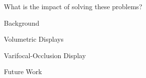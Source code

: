 \begin{compact_todolist}
\begin{compact_todolist}
    \item What is the impact of solving these problems?
    \end{compact_todolist}
\item Background
    \begin{compact_todolist}
    \item 
    \end{compact_todolist}
\item Volumetric Displays
    \begin{compact_todolist}
    \item 
    \end{compact_todolist}
\item Varifocal-Occlusion Display
    \begin{compact_todolist}
    \item 
    \end{compact_todolist}
\item Future Work
    \begin{compact_todolist}
    \item {}
    \item {}
    \item {}
    \end{compact_todolist}
\end{compact_todolist}

